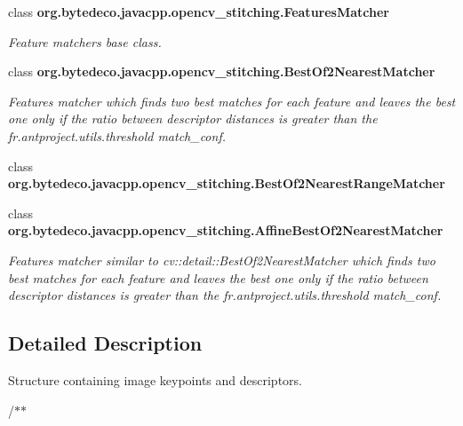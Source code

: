 \begin{DoxyCompactItemize}
class {\bfseries org.\+bytedeco.\+javacpp.\+opencv\+\_\+stitching.\+Features\+Matcher}
\begin{DoxyCompactList}\small\item\em Feature matchers base class. \end{DoxyCompactList}\item 
class {\bfseries org.\+bytedeco.\+javacpp.\+opencv\+\_\+stitching.\+Best\+Of2\+Nearest\+Matcher}
\begin{DoxyCompactList}\small\item\em Features matcher which finds two best matches for each feature and leaves the best one only if the ratio between descriptor distances is greater than the fr.antproject.utils.threshold match\+\_\+conf. \end{DoxyCompactList}\item
class {\bfseries org.\+bytedeco.\+javacpp.\+opencv\+\_\+stitching.\+Best\+Of2\+Nearest\+Range\+Matcher}
\item 
class {\bfseries org.\+bytedeco.\+javacpp.\+opencv\+\_\+stitching.\+Affine\+Best\+Of2\+Nearest\+Matcher}
\begin{DoxyCompactList}\small\item\em Features matcher similar to cv\+::detail\+::\+Best\+Of2\+Nearest\+Matcher which finds two best matches for each feature and leaves the best one only if the ratio between descriptor distances is greater than the fr.antproject.utils.threshold match\+\_\+conf. \end{DoxyCompactList}\end{DoxyCompactItemize}


\subsection{Detailed Description}
Structure containing image keypoints and descriptors. 

/$\ast$$\ast$ 
